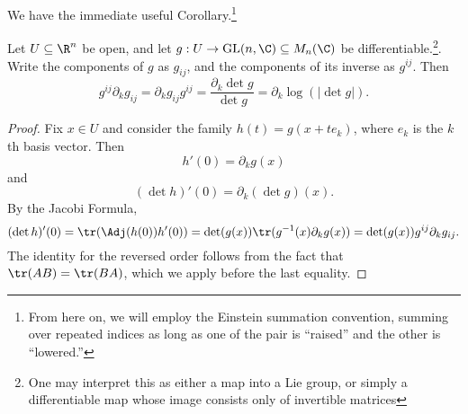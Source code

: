 \documentclass[12pt]{article}
\begin{document}
We have the immediate useful Corollary.\footnote{From here on, we will employ the Einstein summation convention, summing over repeated indices as long as one of the pair is ``raised'' and the other is ``lowered.''}
\begin{cor}Let $U \subseteq \R^n$ be open, and let $g:U \to \text{GL}(n,\C) \subseteq M_n(\C)$ be differentiable.\footnote{One may interpret this as either a map into a Lie group, or simply a differentiable map whose image consists only of invertible matrices}. Write the components of $g$ as $g_{ij}$, and the components of its inverse as $g^{ij}$. Then
\[g^{ij}\partial_k g_{ij} = \partial_k g_{ij} g^{ij} = \frac{\partial_k \det g}{\det g} = \partial_k \log(|\det g|).\]\end{cor}
\begin{proof}Fix $x \in U$ and consider the family $h(t) = g(x+te_k)$, where $e_k$ is the $k$th basis vector. Then
\[h'(0) = \partial_k g(x)\]
and
\[(\det h)'(0) = \partial_k (\det g)(x).\] By the Jacobi Formula,
\[(\det h)'(0) = \tr(\Adj(h(0))h'(0)) = \det(g(x))\tr(g^{-1}(x)\partial_k g(x)) = \det(g(x))g^{ij}\partial_kg_{ij}.\]
The identity for the reversed order follows from the fact that $\tr(AB) = \tr(BA)$, which we apply before the last equality.
\end{proof}
\end{document}
